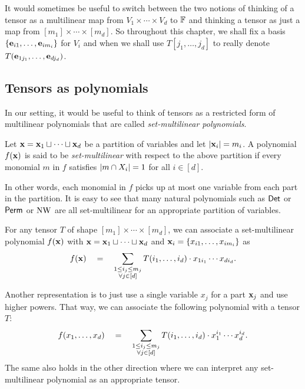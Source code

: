It would sometimes be useful to switch between the two notions of thinking of a tensor as a multilinear map from $V_1 \times \cdots \times V_d$ to $\mathbb{F}$ and thinking a tensor as just a map from $[m_1] \times \cdots \times [m_d]$.
So throughout this chapter, we shall fix a basis $\left\{\mathbf{e}_{i1},\ldots, \mathbf{e}_{im_i}\right\}$ for $V_i$ and when we shall use $T[j_1,\ldots, j_d]$ to really denote $T(\mathbf{e}_{1j_1},\ldots, \mathbf{e}_{dj_d})$.

\subsection{Tensors as polynomials}

In our setting, it would be useful to think of tensors as a restricted form of multilinear polynomials that are called \emph{set-multilinear polynomials}.

\begin{definition}\label{defn:set-multilinear}
  Let $\mathbf{x} = \mathbf{x}_1 \sqcup \cdots \sqcup \mathbf{x}_d$ be a partition of variables and let $|\mathbf{x}_i| = m_i$.
A polynomial $f(\mathbf{x})$ is said to be \emph{set-multilinear} with respect to the above partition if every monomial $m$ in $f$ satisfies $\left|m \cap X_i\right| = 1$ for all $i \in [d]$.
\end{definition}
In other words, each monomial in $f$ picks up at most one variable from each part in the partition. It is easy to see that many natural polynomials such as $\operatorname{\mathsf{Det}}$ or $\operatorname{\mathsf{Perm}}$ or $\operatorname{\mathrm{NW}}$ are all set-multilinear for an appropriate partition of variables. 

\begin{observation}\label{obs:tensor-to-sml}
  For any tensor $T$ of shape $[m_1] \times \cdots \times [m_d]$, we can associate a set-multilinear polynomial $f(\mathbf{x})$ with $\mathbf{x} = \mathbf{x}_1 \sqcup \cdots \sqcup \mathbf{x}_d$ and $\mathbf{x}_i = \left\{x_{i1}, \ldots, x_{im_i}\right\}$ as
\begin{equation}\label{eqn:tensor-sml}
f(\mathbf{x}) \quad = \quad \sum_{\substack{1 \leq i_j \leq m_j\\ \forall j \in [d]}}  T(i_1,\ldots, i_d) \cdot x_{1i_1}\cdots x_{di_d}.
\end{equation}
\end{observation}

Another representation is to just use a single variable $x_j$ for a part $\mathbf{x}_j$ and use higher powers.
That way, we can associate the following polynomial with a tensor $T$:
\begin{equation}\label{eqn:tensor-to-prod-univariates}
f(x_1,\ldots, x_d) \quad = \quad \sum_{\substack{1 \leq i_j \leq m_j\\ \forall j \in [d]}}  T(i_1,\ldots, i_d) \cdot x_{1}^{i_1}\cdots x_{d}^{i_d}.
\end{equation}
The same also holds in the other direction where we can interpret any set-multilinear polynomial as an appropriate tensor. 



